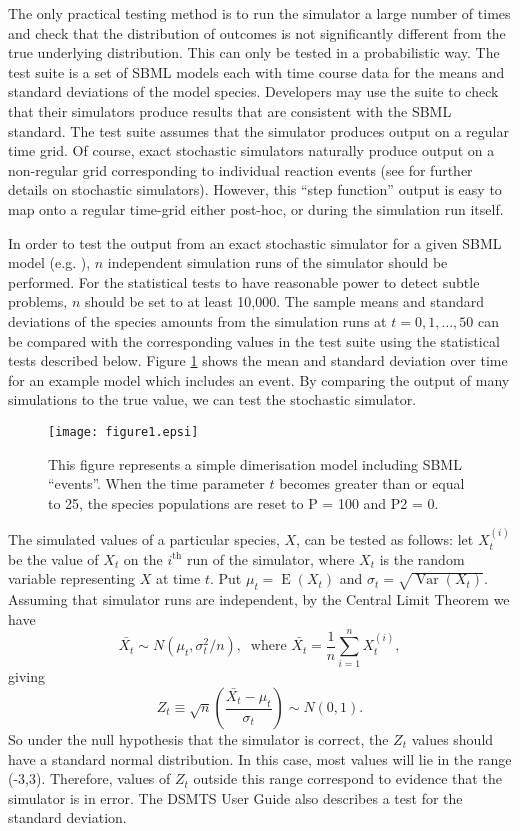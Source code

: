 \documentclass{bioinfo}
\begin{document}
The only practical testing method is to run the simulator a large
number of times and check that the distribution of outcomes is not
significantly different from the true underlying distribution.
This can only be tested in a probabilistic way. The test suite is a
set of SBML models each with time course data for the means and
standard deviations of the model species. Developers may use the suite
to check that their simulators produce results that are consistent
with the SBML standard. The test suite assumes that the simulator
produces output on a regular time grid. Of course, exact stochastic
simulators naturally produce output on a non-regular grid
corresponding to individual reaction events (see \cite{Wilkinson06}
for further details on stochastic simulators). However, this ``step
function'' output is easy to map onto a regular time-grid either
post-hoc, or during the simulation run itself.

In order to test the output from an exact stochastic simulator for a
given SBML model (e.g. \cite{Gillespie77}), $n$ independent simulation
runs of the simulator should be performed. For the statistical tests
to have reasonable power to detect subtle problems, $n$ should be set
to at least 10,000. The sample means and standard deviations of the
species amounts from the simulation runs at $t=0,1,\ldots,50$ can be
compared with the corresponding values in the test suite using the
statistical tests described below. Figure \ref{figure1} shows the mean
and standard deviation over time for an example model which includes an
event. By comparing the output of many simulations to the true value,
we can test the stochastic simulator.
\begin{figure}[!t]
\centerline{\texttt{[image: figure1.epsi]}}
\caption{This figure represents a simple dimerisation model including SBML ``events''. When the time parameter $t$ becomes greater than or equal to 25, the species populations are reset to P = 100 and P2 = 0.}\label{figure1}
\end{figure}
The simulated values of a particular species, $X$, can be tested as
follows: let $X_t^{(i)}$ be the value of $X_t$ on the $i^{\mbox{th}}$
run of the simulator, where $X_t$ is the random variable representing
$X$ at time $t$. Put $\mu_t=\operatorname{E}(X_t)$ and
$\sigma_t=\sqrt{\operatorname{Var}(X_t)}$. Assuming that simulator
runs are independent, by the Central Limit
Theorem we have $$
\bar{X_t} \sim N( \mu_t, \sigma_t^2/n ),\ 
\text{ where }
\bar{X_t}=\frac{1}{n}\sum_{i=1}^n X_t^{(i)},
$$
giving
$$
Z_t \equiv \sqrt{n}\left( \frac{\bar{X_t} -\mu_t}{\sigma_t}\right)\sim N(0,1).
$$
So under the null hypothesis that the simulator is correct, the $Z_t$
values should have a standard normal distribution. In this case, most
values will lie in the range (-3,3). Therefore, values of $Z_t$
outside this range correspond to evidence that the simulator is in
error. The DSMTS User Guide also describes a test for the standard deviation.
\end{document}
